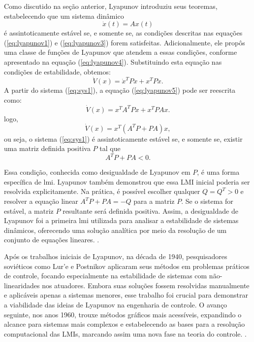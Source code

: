 Como discutido na seção anterior, Lyapunov introduziu seus teoremas, estabelecendo que um sistema dinâmico \begin{equation} \dot{x}(t) = Ax(t) \label{eq:sys1}\end{equation} é assintoticamente estável se, e somente se, as condições descritas nas equações (\ref{eq:lyapunov1}) e (\ref{eq:lyapunov3}) forem satisfeitas. Adicionalmente, ele propôs uma classe de funções de Lyapunov que atendem a essas condições, conforme apresentado na equação (\ref{eq:lyapunov4}). Substituindo esta equação nas condições de estabilidade, obtemos: \begin{equation} \dot{V}(x) = \dot{x}^TPx + x^TP\dot{x} \label{eq:lyapunov5}. \end{equation} A partir do sistema (\ref{eq:sys1}), a equação (\ref{eq:lyapunov5}) pode ser reescrita como: \begin{equation} \dot{V}(x) = x^TA^TPx + x^TPAx \label{eq:lyapunov6}. \end{equation} logo, \begin{equation} \dot{V}(x) = x^T (A^TP + PA) x \label{eq:lyapunov6}, \end{equation} ou seja, o sistema (\ref{eq:sys1}) é assintoticamente estável se, e somente se, existir uma matriz definida positiva $P$ tal que \begin{equation} A^T P + P A < 0.\end{equation}

Essa condição, conhecida como desigualdade de Lyapunov em $P$, é uma forma específica de \acrshort{lmi}. Lyapunov também demonstrou que essa LMI inicial poderia ser resolvida explicitamente. Na prática, é possível escolher qualquer $Q = Q^T > 0$ e resolver a equação linear $A^T P + P A = -Q$ para a matriz $P$. Se o sistema for estável, a matriz $P$ resultante será definida positiva. Assim, a desigualdade de Lyapunov foi a primeira \acrshort{lmi} utilizada para analisar a estabilidade de sistemas dinâmicos, oferecendo uma solução analítica por meio da resolução de um conjunto de equações lineares. \cite{lyapunov1892,boyd1994}.

Após os trabalhos iniciais de Lyapunov, na década de 1940, pesquisadores soviéticos como Lur'e e Postnikov aplicaram seus métodos em problemas práticos de controle, focando especialmente na estabilidade de sistemas com não-linearidades nos atuadores. Embora suas soluções fossem resolvidas manualmente e aplicáveis apenas a sistemas menores, esse trabalho foi crucial para demonstrar a viabilidade das ideias de Lyapunov na engenharia de controle. O avanço seguinte, nos anos 1960, trouxe métodos gráficos mais acessíveis, expandindo o alcance para sistemas mais complexos e estabelecendo as bases para a resolução computacional das LMIs, marcando assim uma nova fase na teoria do controle. \cite{boyd1994}.

